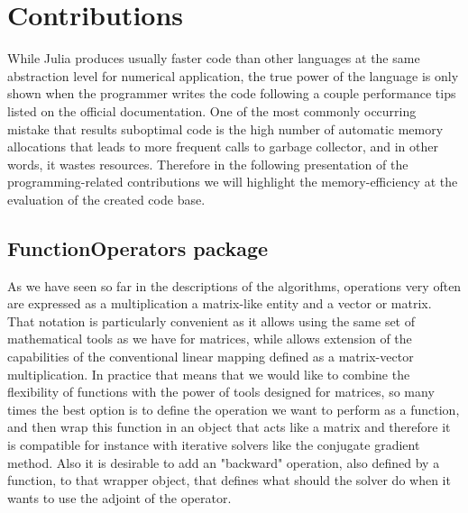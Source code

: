 \chapter{Contributions}

While Julia produces usually faster code than other languages at the same abstraction level for numerical application, the true power of the language is only shown when the programmer writes the code following a couple performance tips listed on the official documentation. One of the most commonly occurring mistake that results suboptimal code is the high number of automatic memory allocations that leads to more frequent calls to garbage collector, and in other words, it wastes resources. Therefore in the following presentation of the programming-related contributions we will highlight the memory-efficiency at the evaluation of the created code base.

\section{FunctionOperators package}

As we have seen so far in the descriptions of the algorithms, operations very often are expressed as a multiplication a matrix-like entity and a vector or matrix. That notation is particularly convenient as it allows using the same set of mathematical tools as we have for matrices, while allows extension of the capabilities of the conventional linear mapping defined as a matrix-vector multiplication. In practice that means that we would like to combine the flexibility of functions with the power of tools designed for matrices, so many times the best option is to define the operation we want to perform as a function, and then wrap this function in an object that acts like a matrix and therefore it is compatible for instance with iterative solvers like the conjugate gradient method. Also it is desirable to add an "backward" operation, also defined by a function, to that wrapper object, that defines what should the solver do when it wants to use the adjoint of the operator.


